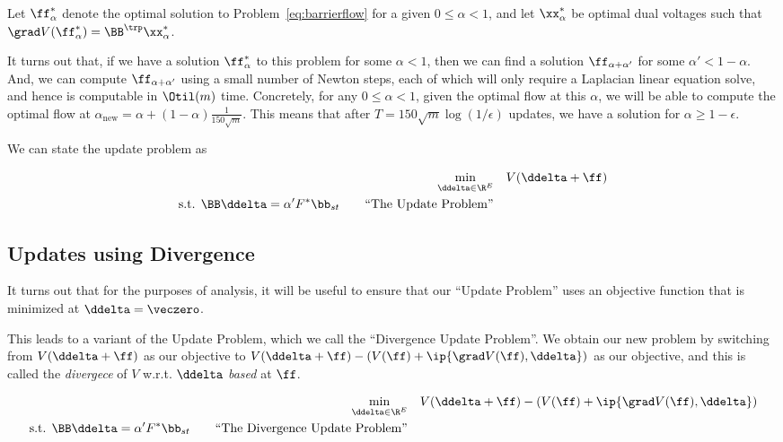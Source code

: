 Let $\ff^*_{\alpha}$ denote the optimal solution to
Problem~\ref{eq:barrierflow} for a given $0 \leq \alpha < 1$,
and let $\xx^*_{\alpha}$ be optimal dual voltages such that $\grad V(\ff^*_{\alpha}) = \BB^{\trp} \xx^*_{\alpha}$.

It turns out that, if we have a solution $\ff^*_{\alpha}$ to this problem for some
$\alpha < 1$, then we can find a solution $\ff_{\alpha+\alpha'}$ for
some $\alpha' < 1-\alpha$.
And, we can compute $\ff_{\alpha+\alpha'}$ using a small number of Newton
steps, each of which will only require a Laplacian linear equation
solve, and hence is computable in $\Otil(m)$ time.
Concretely, for any $0 \leq \alpha < 1$,
given the optimal flow at this $\alpha$, we will be able to compute
the optimal flow at $\alpha_{\text{new}} = \alpha + (1-\alpha)
\frac{1}{150\sqrt{m}}$.
This means that after $T = 150\sqrt{m}\log(1/\epsilon)$ updates, we have a solution
for $\alpha \geq 1-\epsilon$.

We can state the update problem as 

\begin{align}
 \label{eq:updateflow}
  \min_{\ddelta \in \R^E} & \quad 
    V(\ddelta+\ff)
  \\
\textrm{s.t. }  \BB\ddelta = \alpha' F^* \bb_{st}
  \tag*{``The Update Problem''}
\end{align}

\subsection{Updates using Divergence}

It turns out that for the purposes of analysis, it will be useful to
ensure that our ``Update Problem'' uses an objective function that is
minimized at $\ddelta = \veczero$.

This leads to a variant of the Update Problem, which we call the
``Divergence Update Problem''.
We obtain our new problem by switching from
$ V(\ddelta+\ff)$ as our objective to  $V(\ddelta+\ff)
  -
  (V(\ff)
  +
  \ip{\grad V(\ff), \ddelta})$ as our objective, and this is called
  the \emph{divergece} of $V$ w.r.t. $\ddelta$ \emph{based} at $\ff$.
  
\begin{align}
 \label{eq:divflow}
  \min_{\ddelta \in \R^E} & \quad 
    V(\ddelta+\ff)
  -
  (V(\ff)
  +
  \ip{\grad V(\ff), \ddelta})
  \\
\textrm{s.t. }  \BB\ddelta = \alpha' F^* \bb_{st}
  \tag*{``The Divergence Update Problem''}
\end{align}

